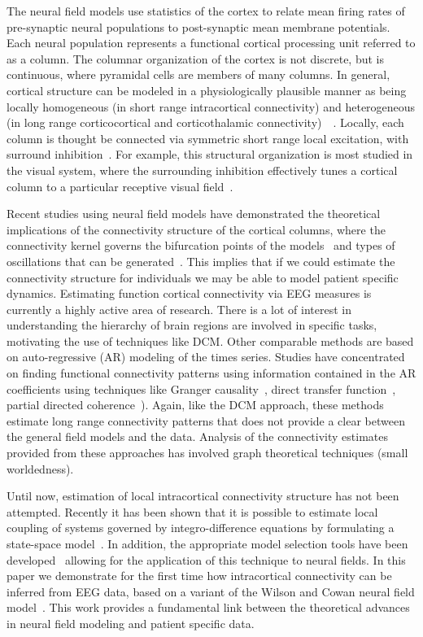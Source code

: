 \documentclass[onecolumn,draftcls]{IEEEtran}
\begin{document}
The neural field models use statistics of the cortex to relate mean firing rates of pre-synaptic neural populations to post-synaptic mean membrane potentials. Each neural population represents a functional cortical processing unit referred to as a column. The columnar organization of the cortex is not discrete, but is continuous, where pyramidal cells are members of many columns. In general, cortical structure can be modeled in a physiologically plausible manner as being locally homogeneous (in short range intracortical connectivity) and heterogeneous (in long range corticocortical and corticothalamic connectivity)~\cite{Jirsa2009}~\cite{Qubbaj2007}. Locally, each column is thought be connected via symmetric short range local excitation, with surround inhibition~\cite{Braitenberg1998}. For example, this structural organization is most studied in the visual system, where the surrounding inhibition effectively tunes a cortical column to a particular receptive visual field~\cite{Sullivan2006}.

Recent studies using neural field models have demonstrated the theoretical implications of the connectivity structure of the cortical columns, where the connectivity kernel governs the bifurcation points of the models~\cite{Hutt2005} and types of oscillations that can be generated~\cite{Schmidt2009}. This implies that if we could estimate the connectivity structure for individuals we may be able to model patient specific dynamics. Estimating function cortical connectivity via EEG measures is currently a highly active area of research. There is a lot of interest in understanding the hierarchy of brain regions are involved in specific tasks, motivating the use of techniques like DCM. Other comparable methods are based on auto-regressive (AR) modeling of the times series. Studies have concentrated on finding functional connectivity patterns using information contained in the AR coefficients using techniques like Granger causality~\cite{Hesse2003}, direct transfer function~\cite{Kaminski1991}, partial directed coherence~\cite{Sameshima1999}). Again, like the DCM approach, these methods estimate long range connectivity patterns that does not provide a clear between the general field models and the data. Analysis of the connectivity estimates provided from these approaches has involved graph theoretical techniques (small worldedness).

Until now, estimation of local intracortical connectivity structure has not been attempted. Recently it has been shown that it is possible to estimate local coupling of systems governed by integro-difference equations by formulating a state-space model~\cite{Dewar2009}. In addition, the appropriate model selection tools have been developed~\cite{Scerri2009} allowing for the application of this technique to neural fields. In this paper we demonstrate for the first time how intracortical connectivity can be inferred from EEG data, based on a variant of the  Wilson and Cowan neural field model~\cite{Wilson1973}. This work provides a fundamental link between the theoretical advances in neural field modeling and patient specific data.
\end{document}
